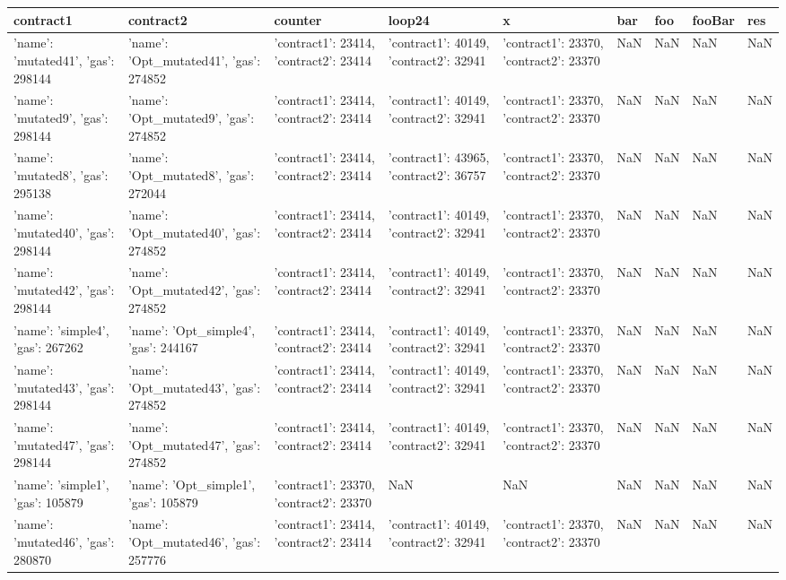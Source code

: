 \begin{tabular}{lllllllll}
\toprule
contract1 & contract2 & counter & loop24 & x & bar & foo & fooBar & res \\
\midrule
{'name': 'mutated41', 'gas': 298144} & {'name': 'Opt_mutated41', 'gas': 274852} & {'contract1': 23414, 'contract2': 23414} & {'contract1': 40149, 'contract2': 32941} & {'contract1': 23370, 'contract2': 23370} & NaN & NaN & NaN & NaN \\
{'name': 'mutated9', 'gas': 298144} & {'name': 'Opt_mutated9', 'gas': 274852} & {'contract1': 23414, 'contract2': 23414} & {'contract1': 40149, 'contract2': 32941} & {'contract1': 23370, 'contract2': 23370} & NaN & NaN & NaN & NaN \\
{'name': 'mutated8', 'gas': 295138} & {'name': 'Opt_mutated8', 'gas': 272044} & {'contract1': 23414, 'contract2': 23414} & {'contract1': 43965, 'contract2': 36757} & {'contract1': 23370, 'contract2': 23370} & NaN & NaN & NaN & NaN \\
{'name': 'mutated40', 'gas': 298144} & {'name': 'Opt_mutated40', 'gas': 274852} & {'contract1': 23414, 'contract2': 23414} & {'contract1': 40149, 'contract2': 32941} & {'contract1': 23370, 'contract2': 23370} & NaN & NaN & NaN & NaN \\
{'name': 'mutated42', 'gas': 298144} & {'name': 'Opt_mutated42', 'gas': 274852} & {'contract1': 23414, 'contract2': 23414} & {'contract1': 40149, 'contract2': 32941} & {'contract1': 23370, 'contract2': 23370} & NaN & NaN & NaN & NaN \\
{'name': 'simple4', 'gas': 267262} & {'name': 'Opt_simple4', 'gas': 244167} & {'contract1': 23414, 'contract2': 23414} & {'contract1': 40149, 'contract2': 32941} & {'contract1': 23370, 'contract2': 23370} & NaN & NaN & NaN & NaN \\
{'name': 'mutated43', 'gas': 298144} & {'name': 'Opt_mutated43', 'gas': 274852} & {'contract1': 23414, 'contract2': 23414} & {'contract1': 40149, 'contract2': 32941} & {'contract1': 23370, 'contract2': 23370} & NaN & NaN & NaN & NaN \\
{'name': 'mutated47', 'gas': 298144} & {'name': 'Opt_mutated47', 'gas': 274852} & {'contract1': 23414, 'contract2': 23414} & {'contract1': 40149, 'contract2': 32941} & {'contract1': 23370, 'contract2': 23370} & NaN & NaN & NaN & NaN \\
{'name': 'simple1', 'gas': 105879} & {'name': 'Opt_simple1', 'gas': 105879} & {'contract1': 23370, 'contract2': 23370} & NaN & NaN & NaN & NaN & NaN & NaN \\
{'name': 'mutated46', 'gas': 280870} & {'name': 'Opt_mutated46', 'gas': 257776} & {'contract1': 23414, 'contract2': 23414} & {'contract1': 40149, 'contract2': 32941} & {'contract1': 23370, 'contract2': 23370} & NaN & NaN & NaN & NaN \\

\end{tabular}
